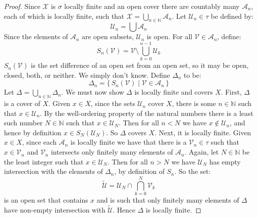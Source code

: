 \documentclass{article}
\theoremstyle{plain}
\theoremstyle{normal}
\begin{document}
        \begin{proof}
            Since $\mathcal{X}$ is $\sigma$ locally finite and an open cover
            there are countably many $\mathcal{A}_{n}$, each of which is
            locally finite, such that
            $\mathcal{X}=\bigcup_{n\in\mathbb{N}}\mathcal{A}_{n}$. Let
            $\mathcal{U}_{n}\in\tau$ be defined by:
            \begin{equation}
                \mathcal{U}_{n}=\bigcup\mathcal{A}_{n}
            \end{equation}
            Since the elements of $\mathcal{A}_{n}$ are open subsets,
            $\mathcal{U}_{n}$ is open. For all
            $\mathcal{V}\in\mathcal{A}_{n}$, define:
            \begin{equation}
                S_{n}(\mathcal{V})=
                \mathcal{V}\setminus\bigcup_{k=0}^{n-1}\mathcal{U}_{k}
            \end{equation}
            $S_{n}(\mathcal{V})$ is the set difference of an open set from
            an open set, so it may be open, closed, both, or neither. We simply
            don't know. Define $\Delta_{n}$ to be:
            \begin{equation}
                \Delta_{n}
                =\{\,S_{n}(\mathcal{V})\;|\;\mathcal{V}\in\mathcal{A}_{n}\,\}
            \end{equation}
            Let $\Delta=\bigcup_{n\in\mathbb{N}}\Delta_{n}$. We must now show
            $\Delta$ is locally finite and covers $X$. First, $\Delta$ is a
            cover of $X$. Given $x\in{X}$, since the sets $\mathcal{U}_{n}$ cover
            $X$, there is some $n\in\mathbb{N}$ such that $x\in\mathcal{U}_{n}$.
            By the well-ordering property of the natural numbers there is a
            least such number $N\in\mathbb{N}$ such that $x\in\mathcal{U}_{N}$.
            Then for all $n<N$ we have $x\notin\mathcal{U}_{n}$, and hence
            by definition $x\in{S}_{N}(\mathcal{U}_{N})$. So
            $\Delta$ covers $X$. Next, it is locally finite. Given
            $x\in{X}$, since each $\mathcal{A}_{n}$ is locally finite we have
            that there is a $\mathcal{V}_{n}\in\tau$ such that
            $x\in\mathcal{V}_{n}$ and $\mathcal{V}_{n}$ intersects only
            finitely many elements of $\mathcal{A}_{n}$. Again, let
            $N\in\mathbb{N}$ be the least integer such that
            $x\in\mathcal{U}_{N}$. Then for all $n>N$ we have
            $\mathcal{U}_{N}$ has empty intersection with the elements of
            $\Delta_{n}$, by definition of $S_{n}$. So the set:
            \begin{equation}
                \tilde{\mathcal{U}}
                =\mathcal{U}_{N}\cap\bigcap_{k=0}^{N}\mathcal{V}_{k}
            \end{equation}
            is an open set that contains $x$ and is such that only finitely
            many elements of $\Delta$ have non-empty intersection with
            $\tilde{\mathcal{U}}$. Hence $\Delta$ is locally finite.
        \end{proof}
\end{document}
